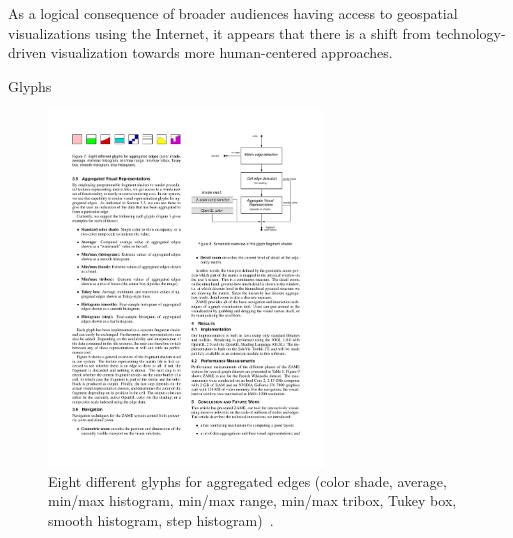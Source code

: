As a logical consequence of broader audiences having access to geospatial visualizations using the Internet, it appears that there is a shift from technology-driven visualization towards more human-centered approaches. 

Glyphs


\begin{figure}[h]
  \begin{center}
    \includegraphics[width=0.65\textwidth]{figures/glyphs_zame.pdf}
    \caption{Eight different glyphs for aggregated edges (color shade,
average, min/max histogram, min/max range, min/max tribox, Tukey
box, smooth histogram, step histogram)~\cite{ElmqvistDGHF08}.}
    \label{fig:glyphs-zame}
  \end{center}
\end{figure}

